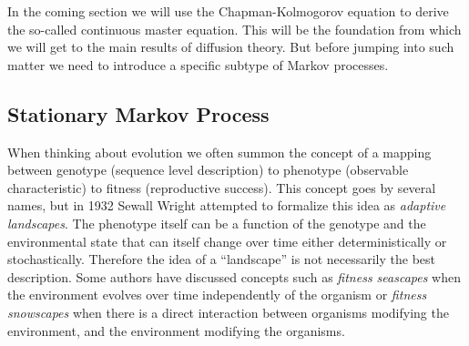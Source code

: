 In the coming section we will use the Chapman-Kolmogorov equation to derive the
so-called continuous master equation. This will be the foundation from which we
will get to the main results of diffusion theory. But before jumping into such
matter we need to introduce a specific subtype of Markov processes.

\subsection{Stationary Markov Process}\label{sec_stationary_process}

When thinking about evolution we often summon the concept of a mapping between
genotype (sequence level description) to phenotype (observable characteristic)
to fitness (reproductive success). This concept goes by several names, but in
1932 Sewall Wright attempted to formalize this idea as \textit{adaptive
landscapes}. The phenotype itself can be a function of the genotype and the
environmental state that can itself change over time either deterministically
or stochastically. Therefore the idea of a ``landscape'' is not necessarily the
best description. Some authors have discussed concepts such as \textit{fitness
seascapes} when the environment evolves over time independently of the organism
or \textit{fitness snowscapes} when there is a direct interaction between
organisms modifying the environment, and the environment modifying the
organisms.

